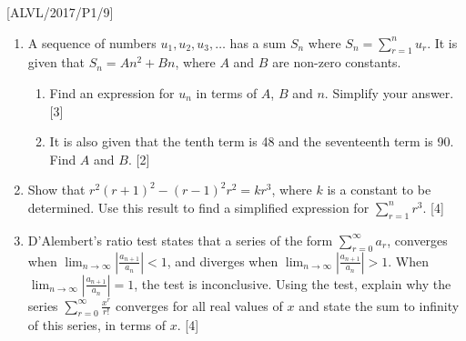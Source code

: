 \item {[}ALVL/2017/P1/9{]}
\begin{enumerate}
\item A sequence of numbers $u_{1},u_{2},u_{3},\dots$ has a sum $S_{n}$
where $S_{n}=\sum_{r=1}^{n}u_{r}$. It is given that $S_{n}=An^{2}+Bn$,
where $A$ and $B$ are non-zero constants. 
\begin{enumerate}
\item Find an expression for $u_{n}$ in terms of $A$, $B$ and $n$. Simplify
your answer. \hfill{}{[}3{]}
\item It is also given that the tenth term is 48 and the seventeenth term
is 90. Find $A$ and $B$. \hfill{}{[}2{]}
\end{enumerate}
\item Show that $r^{2}\left(r+1\right)^{2}-\left(r-1\right)^{2}r^{2}=kr^{3}$,
where $k$ is a constant to be determined. Use this result to find
a simplified expression for $\sum_{r=1}^{n}r^{3}$. \hfill{}{[}4{]}
\item D'Alembert's ratio test states that a series of the form $\sum_{r=0}^{\infty}a_{r}$,
converges when $\lim_{n\rightarrow\infty}\left|\frac{a_{n+1}}{a_{n}}\right|<1$,
and diverges when $\lim_{n\rightarrow\infty}\left|\frac{a_{n+1}}{a_{n}}\right|>1$.
When $\lim_{n\rightarrow\infty}\left|\frac{a_{n+1}}{a_{n}}\right|=1$,
the test is inconclusive. Using the test, explain why the series $\sum_{r=0}^{\infty}\frac{x^{r}}{r!}$
converges for all real values of $x$ and state the sum to infinity
of this series, in terms of $x$.\hfill{} {[}4{]}
\end{enumerate}
